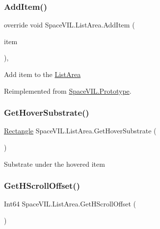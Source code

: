 \subsubsection{\texorpdfstring{Add\+Item()}{AddItem()}}
{\footnotesize\ttfamily override void Space\+V\+I\+L.\+List\+Area.\+Add\+Item (\begin{DoxyParamCaption}\item[{\mbox{\hyperlink{interface_space_v_i_l_1_1_core_1_1_i_base_item}{I\+Base\+Item}}}]{item }\end{DoxyParamCaption})\hspace{0.3cm}{\ttfamily [inline]}, {\ttfamily [virtual]}}



Add item to the \mbox{\hyperlink{class_space_v_i_l_1_1_list_area}{List\+Area}} 



Reimplemented from \mbox{\hyperlink{class_space_v_i_l_1_1_prototype}{Space\+V\+I\+L.\+Prototype}}.

\mbox{\label{class_space_v_i_l_1_1_list_area_af2b6ef18d4cbaea198704bf1d0dac97a}} 
\subsubsection{\texorpdfstring{Get\+Hover\+Substrate()}{GetHoverSubstrate()}}
{\footnotesize\ttfamily \mbox{\hyperlink{class_space_v_i_l_1_1_rectangle}{Rectangle}} Space\+V\+I\+L.\+List\+Area.\+Get\+Hover\+Substrate (\begin{DoxyParamCaption}{ }\end{DoxyParamCaption})\hspace{0.3cm}{\ttfamily [inline]}}



Substrate under the hovered item 

\mbox{\label{class_space_v_i_l_1_1_list_area_afa9d172433e60b22c5220c06acff38fd}} 
\subsubsection{\texorpdfstring{Get\+H\+Scroll\+Offset()}{GetHScrollOffset()}}
{\footnotesize\ttfamily Int64 Space\+V\+I\+L.\+List\+Area.\+Get\+H\+Scroll\+Offset (\begin{DoxyParamCaption}{ }\end{DoxyParamCaption})\hspace{0.3cm}{\ttfamily [inline]}}



